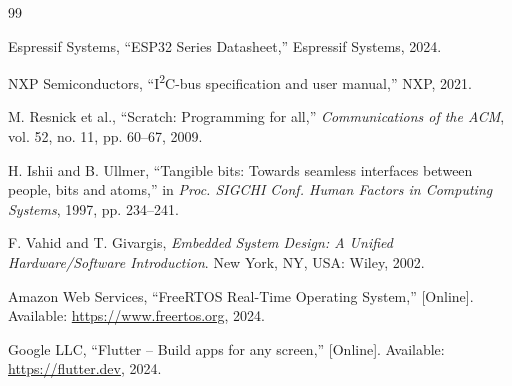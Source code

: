 \documentclass[10pt, conference]{IEEEtran}
\begin{document}
\begin{thebibliography}{99} 

Espressif Systems, ``ESP32 Series Datasheet,'' Espressif Systems, 2024.

NXP Semiconductors, ``I\textsuperscript{2}C-bus specification and user manual,'' NXP, 2021.

M. Resnick et al., ``Scratch: Programming for all,'' \emph{Communications of the ACM}, vol. 52, no. 11, pp. 60--67, 2009.

H. Ishii and B. Ullmer, ``Tangible bits: Towards seamless interfaces between people, bits and atoms,'' in \emph{Proc. SIGCHI Conf. Human Factors in Computing Systems}, 1997, pp. 234--241.

F. Vahid and T. Givargis, \emph{Embedded System Design: A Unified Hardware/Software Introduction}. New York, NY, USA: Wiley, 2002.

Amazon Web Services, ``FreeRTOS Real-Time Operating System,'' [Online]. Available: \url{https://www.freertos.org}, 2024.

Google LLC, ``Flutter -- Build apps for any screen,'' [Online]. Available: \url{https://flutter.dev}, 2024.

\end{thebibliography}
\end{document}
